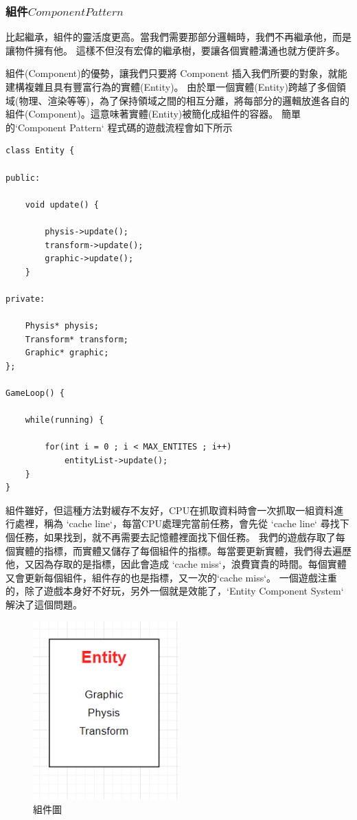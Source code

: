 \subsubsection{組件\(Component Pattern\)}

比起繼承，組件的靈活度更高。當我們需要那部分邏輯時，我們不再繼承他，而是讓物件擁有他。
這樣不但沒有宏偉的繼承樹，要讓各個實體溝通也就方便許多。

組件(Component)的優勢，讓我們只要將 Component 插入我們所要的對象，就能建構複雜且具有豐富行為的實體(Entity)。
由於單一個實體(Entity)跨越了多個領域(物理、渲染等等)，為了保持領域之間的相互分離，將每部分的邏輯放進各自的組件(Component)。這意味著實體(Entity)被簡化成組件的容器。
簡單的`Component Pattern` 程式碼的遊戲流程會如下所示

\begin{lstlisting}
class Entity {

public:

    void update() {
    
        physis->update();
        transform->update();
        graphic->update();
    }

private:

    Physis* physis;
    Transform* transform;
    Graphic* graphic;
};

GameLoop() {

    while(running) {
    
        for(int i = 0 ; i < MAX_ENTITES ; i++)
            entityList->update();
    }
}
\end{lstlisting}

組件雖好，但這種方法對緩存不友好，CPU在抓取資料時會一次抓取一組資料進行處裡，稱為 `cache line`，每當CPU處理完當前任務，會先從 `cache line` 尋找下個任務，如果找到，就不再需要去記憶體裡面找下個任務。
我們的遊戲存取了每個實體的指標，而實體又儲存了每個組件的指標。每當要更新實體，我們得去遍歷他，又因為存取的是指標，因此會造成 `cache miss`，浪費寶貴的時間。每個實體又會更新每個組件，組件存的也是指標，又一次的`cache miss`。
一個遊戲注重的，除了遊戲本身好不好玩，另外一個就是效能了，`Entity Component System` 解決了這個問題。

\begin{figure}[h]
    \begin{center}
        \includegraphics[width=0.5\textwidth]{./resources/ecs/componentPattern.png}
    \end{center}
\caption{組件圖}
\label{fig:component}
\end{figure}

